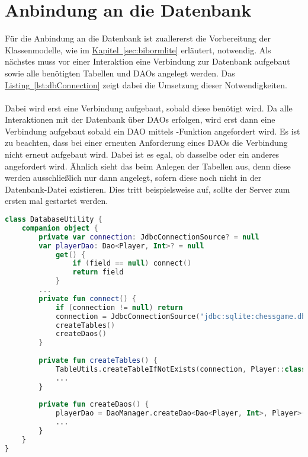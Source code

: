 \section{Anbindung an die Datenbank}\label{sec:conncectionDB}
Für die Anbindung an die Datenbank ist zuallererst die Vorbereitung der Klassenmodelle, wie im \hyperref[sec:bibormlite]{Kapitel~\ref{sec:bibormlite}} erläutert, notwendig.
Als nächstes muss vor einer Interaktion eine Verbindung zur Datenbank aufgebaut sowie alle benötigten Tabellen und \glspl{DAO} angelegt werden. Das \hyperref[lst:dbConnection]{Listing~\ref{lst:dbConnection}} zeigt dabei die Umsetzung  dieser Notwendigkeiten.\\
\\
Dabei wird erst eine Verbindung aufgebaut, sobald diese benötigt wird. Da alle Interaktionen mit der Datenbank über \glspl{DAO} erfolgen, wird erst dann eine Verbindung aufgebaut sobald ein \gls{DAO} mittels -Funktion angefordert wird. Es ist zu beachten, dass bei einer erneuten Anforderung eines \glspl{DAO} die Verbindung nicht erneut aufgebaut wird. Dabei ist es egal, ob dasselbe oder ein anderes angefordert wird. Ähnlich sieht das beim Anlegen der Tabellen aus, denn diese werden ausschließlich nur dann angelegt, sofern diese noch nicht in der Datenbank-Datei existieren. Dies tritt beispielsweise auf, sollte der Server zum ersten mal gestartet werden.
\begin{lstlisting}[style=lstStyleFramed, language=Kotlin, caption={Verbindungsaufbau \& Initialisierung der SQLite Datenbank}, label=lst:dbConnection, float]
class DatabaseUtility {
	companion object {
		private var connection: JdbcConnectionSource? = null
		var playerDao: Dao<Player, Int>? = null
			get() {
				if (field == null) connect()
				return field
			}
		...
		private fun connect() {
			if (connection != null) return
			connection = JdbcConnectionSource("jdbc:sqlite:chessgame.db")
			createTables()
			createDaos()
		}
		
		private fun createTables() {
			TableUtils.createTableIfNotExists(connection, Player::class.java)
			...
		}
		
		private fun createDaos() {
			playerDao = DaoManager.createDao<Dao<Player, Int>, Player>(connection, Player::class.java)
			...
		}
	}
}
\end{lstlisting}

